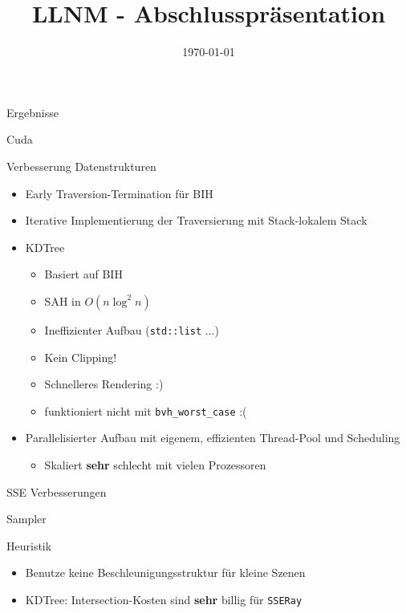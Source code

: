 

\title[LLNM]{LLNM - Abschlusspräsentation}
\subtitle{}
\date{\today}

	\begin{frame}
		\titlepage
	\end{frame}
	\begin{frame}{Ergebnisse}
	\end{frame}
	\begin{frame}{Cuda}
	\end{frame}
	\begin{frame}{Verbesserung Datenstrukturen}
		\begin{itemize}
		\pause
		\item Early Traversion-Termination für BIH
		\pause
		\item Iterative Implementierung der Traversierung mit Stack-lokalem Stack
		\pause
		\item KDTree
		\begin{itemize}
			\item Basiert auf BIH
			\item SAH in $O(n \log^2 n)$
			\item Ineffizienter Aufbau (\texttt{std::list} ...)
			\item Kein Clipping!
			\item Schnelleres Rendering :)
			\item funktioniert nicht mit \texttt{bvh\_worst\_case} :(
		\end{itemize}
		\pause
		\item Parallelisierter Aufbau mit eigenem, effizienten Thread-Pool und Scheduling
		\begin{itemize}
			\item Skaliert \textbf{sehr} schlecht mit vielen Prozessoren
		\end{itemize}
		\end{itemize}
	\end{frame}

	\begin{frame}{SSE Verbesserungen}
	\end{frame}
	\begin{frame}{Sampler}
	\end{frame}
	\begin{frame}{Heuristik}
		\begin{itemize}
		\pause
		\item Benutze keine Beschleunigungsstruktur für kleine Szenen
		\pause
		\item KDTree: Intersection-Kosten sind \textbf{sehr} billig für \texttt{SSERay}
		\end{itemize}
	\end{frame}

